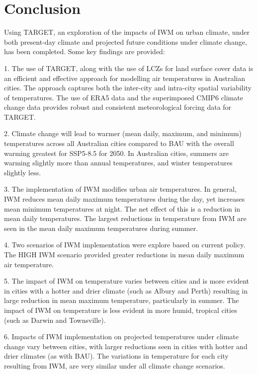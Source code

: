 \documentclass[final,3p,times,authoryear]{elsarticle}
\begin{document}
\section{Conclusion}\label{sec:conclusion}


Using TARGET, an exploration of the impacts of IWM on urban climate, under both present-day climate and projected future conditions under climate change, has been completed. Some key findings are provided:

1. The use of TARGET, along with the use of LCZs for land surface cover data is an efficient and effective approach for modelling air temperatures in Australian cities. The approach captures both the inter-city and intra-city spatial variability of temperatures. The use of ERA5 data and the superimposed CMIP6 climate change data provides robust and consistent meteorological forcing data for TARGET.

2. Climate change will lead to warmer (mean daily, maximum, and minimum) temperatures across all Australian cities compared to BAU with the overall warming greatest for SSP5-8.5 for 2050. In Australian cities, summers are warming slightly more than annual temperatures, and winter temperatures slightly less.

3. The implementation of IWM modifies urban air temperatures. In general, IWM reduces mean daily maximum temperatures during the day, yet increases mean minimum temperatures at night. The net effect of this is a reduction in mean daily temperatures. The largest reductions in temperature from IWM are seen in the mean daily maximum temperatures during summer. 

4. Two scenarios of IWM implementation were explore based on current policy. The HIGH IWM scenario provided greater reductions in mean daily maximum air temperature. 

5. The impact of IWM on temperature varies between cities and is more evident in cities with a hotter and drier climate (such as Albury and Perth) resulting in large reduction in mean maximum temperature, particularly in summer. The impact of IWM on temperature is less evident in more humid, tropical cities (such as Darwin and Townsville). 

6. Impacts of IWM implementation on projected temperatures under climate change vary between cities, with larger reductions seen in cities with hotter and drier climates (as with BAU). The variations in temperature for each city resulting from IWM, are very similar under all climate change scenarios. 
\end{document}

